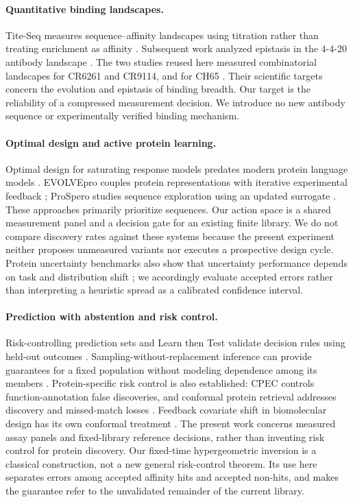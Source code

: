 \documentclass[11pt,letterpaper]{article}
\begin{document}
\paragraph{Quantitative binding landscapes.}
Tite-Seq measures sequence--affinity landscapes using titration rather than treating enrichment as affinity \citep{adams2016}. Subsequent work analyzed epistasis in the 4-4-20 antibody landscape \citep{adams2019}. The two studies reused here measured combinatorial landscapes for CR6261 and CR9114, and for CH65 \citep{phillips2021,phillips2023}. Their scientific targets concern the evolution and epistasis of binding breadth. Our target is the reliability of a compressed measurement decision. We introduce no new antibody sequence or experimentally verified binding mechanism.

\paragraph{Optimal design and active protein learning.}
Optimal design for saturating response models predates modern protein language models \citep{dette1999}. EVOLVEpro couples protein representations with iterative experimental feedback \citep{evolvepro}; ProSpero studies sequence exploration using an updated surrogate \citep{prospero}. These approaches primarily prioritize sequences. Our action space is a shared measurement panel and a decision gate for an existing finite library. We do not compare discovery rates against these systems because the present experiment neither proposes unmeasured variants nor executes a prospective design cycle. Protein uncertainty benchmarks also show that uncertainty performance depends on task and distribution shift \citep{greenman2025}; we accordingly evaluate accepted errors rather than interpreting a heuristic spread as a calibrated confidence interval.

\paragraph{Prediction with abstention and risk control.}
Risk-controlling prediction sets and Learn then Test validate decision rules using held-out outcomes \citep{bates2021,angelopoulos2021}. Sampling-without-replacement inference can provide guarantees for a fixed population without modeling dependence among its members \citep{waudby2020}. Protein-specific risk control is also established: CPEC controls function-annotation false discoveries, and conformal protein retrieval addresses discovery and missed-match losses \citep{ding2024,boger2025}. Feedback covariate shift in biomolecular design has its own conformal treatment \citep{fannjiang2022}. The present work concerns measured assay panels and fixed-library reference decisions, rather than inventing risk control for protein discovery. Our fixed-time hypergeometric inversion is a classical construction, not a new general risk-control theorem. Its use here separates errors among accepted affinity hits and accepted non-hits, and makes the guarantee refer to the unvalidated remainder of the current library.
\end{document}
